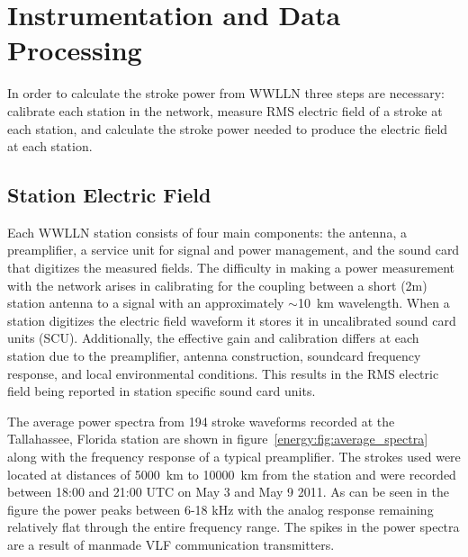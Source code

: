 \section{Instrumentation and Data Processing}

In order to calculate the stroke power from WWLLN three steps are necessary: calibrate each station in the network, measure RMS electric field of a stroke at each station, and calculate the stroke power needed to produce the electric field at each station.

\subsection{Station Electric Field}

Each WWLLN station consists of four main components: the antenna, a preamplifier, a service unit for signal and power management, and the sound card that digitizes the measured fields.
The difficulty in making a power measurement with the network arises in calibrating for the coupling between a short (2m) station antenna to a signal with an approximately $\sim$10~km wavelength.
When a station digitizes the electric field waveform it stores it in uncalibrated sound card units (SCU).
Additionally, the effective gain and calibration differs at each station due to the preamplifier, antenna construction, soundcard frequency response, and local environmental conditions.
This results in the RMS electric field being reported in station specific sound card units.

The average power spectra from 194 stroke waveforms recorded at the Tallahassee, Florida station are shown in figure~\ref{energy:fig:average_spectra} along with the frequency response of a typical preamplifier.
The strokes used were located at distances of 5000~km to 10000~km from the station and were recorded between 18:00 and 21:00 UTC on May 3 and May 9 2011.
As can be seen in the figure the power peaks between 6-18 kHz with the analog response remaining relatively flat through the entire frequency range.
The spikes in the power spectra are a result of manmade VLF communication transmitters.

